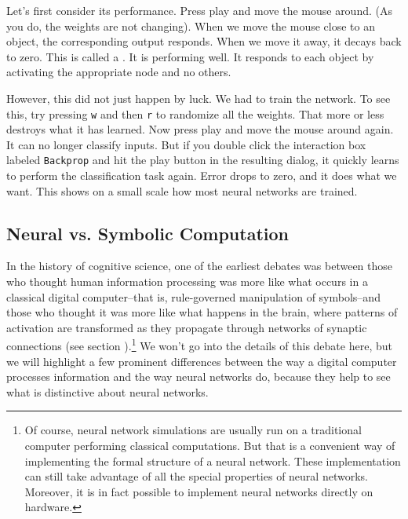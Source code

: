 Let's first consider its performance. Press play and move the mouse around. (As you do, the weights are not changing). When we move the mouse close to an object, the corresponding output responds.  When we move it away, it decays back to zero.  This is called a . It is performing well.  It responds to each object by activating the appropriate node and no others.

However, this did not just happen by luck. We had to train the network. To see this, try pressing \texttt{w} and then \texttt{r} to randomize all the weights. That more or less destroys what it has learned. Now press play and move the mouse around again. It can no longer classify inputs. But if you double click the interaction box labeled \texttt{Backprop} and hit the play button in the resulting dialog, it quickly learns to perform the classification task again. Error drops to zero, and it does what we want. This shows on a small scale how most neural networks are trained.

\subsection{Neural vs. Symbolic Computation}\label{classicalAIComparison}

In the history of cognitive science, one of the earliest debates was between those who thought human information processing was more like what occurs in a classical digital computer--that is, rule-governed manipulation of symbols--and those who thought it was more like what happens in the brain, where patterns of activation are transformed as they propagate through networks of synaptic connections (see section ).\footnote{Of course, neural network simulations are usually run on a traditional computer performing classical computations. But that is a convenient way of implementing the formal structure of a neural network. These implementation can still take advantage of all the special properties of neural networks. Moreover, it is in fact possible to implement neural networks directly on hardware.} We won't go into the details of this debate here, but we will highlight a few prominent differences between the way a digital computer processes information and the way neural networks do, because they help to see what is distinctive about neural networks.

